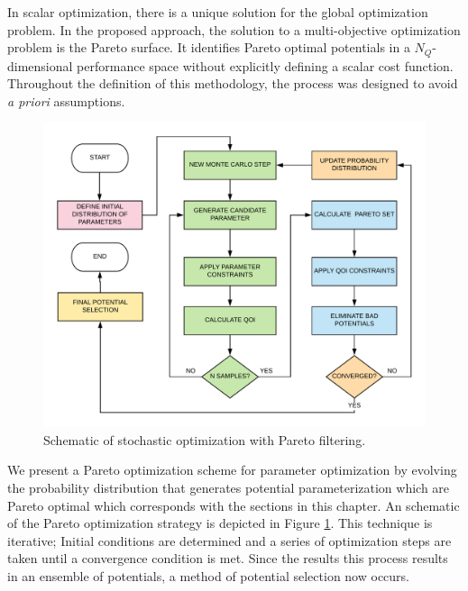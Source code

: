 In scalar optimization, there is a unique solution for the global optimization problem.   In the proposed approach, the solution to a multi-objective optimization problem is the Pareto surface.  It identifies Pareto optimal potentials in a $N_Q$-dimensional performance space without explicitly defining a scalar cost function.  Throughout the definition of this methodology, the process was designed to avoid \emph{a priori} assumptions.


\begin{figure}[ht]
	\centering
	\includegraphics{chapter5/img/pareto_optimization}
	\caption{Schematic of stochastic optimization with Pareto filtering.}
	\label{fig:pareto_optimization}
\end{figure}

We present a Pareto optimization scheme for parameter optimization by evolving the probability distribution that generates potential parameterization which are Pareto optimal which corresponds with the sections in this chapter.  An schematic of the Pareto optimization strategy is depicted in Figure \ref{fig:pareto_optimization}.  This technique is iterative; Initial conditions are determined and a series of optimization steps are taken until a convergence condition is met.  Since the results this process results in an ensemble of potentials, a method of potential selection now occurs.

